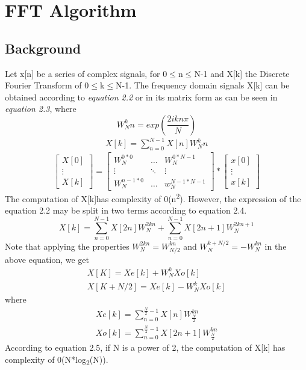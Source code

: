\documentclass{report}
\begin{document}
\chapter{FFT Algorithm}
\section{Background}
Let x[n] be a series of complex signals, for 0$\leq$n$\leq$N-1 and X[k] the Discrete Fourier Transform of 0$\leq$k$\leq$N-1. The frequency domain signals X[k] can be obtained according to \emph{equation 2.2} or in its matrix form as can be seen in \emph{equation 2.3}, where 
\begin{equation}
    W_N^kn =exp(\frac{2ikn\pi}{N})
\end{equation}
\begin{align}
   X[k]=\sum_{n=0}^{N-1} X[n]W_N^kn
\end{align}
\begin{equation}
\begin{bmatrix} 
    X[0]  \\
    \vdots  \\
    X[k] 
    \end{bmatrix} =\begin{bmatrix} 
    W_N^{0*0} &  \dots    & W_N^{0 * N-1}   \\
    \vdots & \ddots  & \vdots \\
    W_N^{n-1 * 0} & \dots       & w_N^{N-1 * N-1} 
    \end{bmatrix} *\begin{bmatrix} 
    x[0]  \\
    \vdots  \\
    x[k] 
    \end{bmatrix}
\end{equation}
The computation of X[k]has complexity of $0$(n\textsuperscript{2}). However, the expression of the equation 2.2 may be split in two terms according to equation 2.4.
\begin{equation}
    X[k]=\sum_{n=0}^{N-1} X[2n]W_N^{2kn} + \sum_{n=0}^{N-1} X[2n+1]W_N^{2kn+1}
\end{equation}
Note that applying the properties  $W_N^{2kn}= W_{N/2}^{kn}$
and $W_N^{k+N/2}= -W_{N}^{kn}$ in the above equation, we get 
\begin{equation}
\begin{aligned}
  X[K]=Xe[k]+W_N^{k} Xo[k] \\
  X[K+N/2]=Xe[k]-W_N^{k} Xo[k] 
\end{aligned}
\end{equation}
where 
\begin{align*} 
Xe[k]=\sum_{n=0}^{\frac{N}{2}-1} X[n]W_\frac{N}{2}^{kn} \\
Xo[k]=\sum_{n=0}^{\frac{N}{2}-1} X[2n+1]W_\frac{N}{2}^{kn}
\end{align*}
According to equation 2.5, if N is a power of 2, the computation of X[k] has complexity of $0$(N*log\textsubscript{2}(N)).
\end{document}
